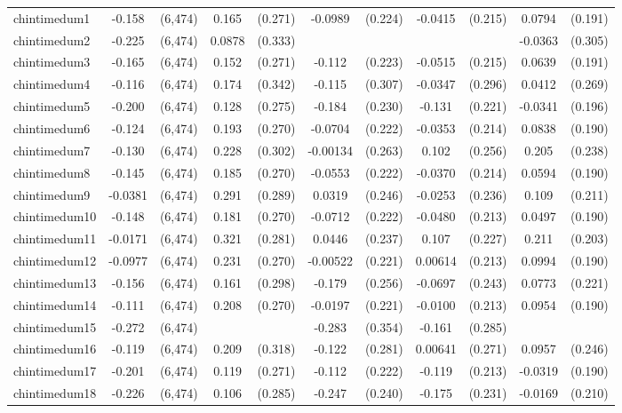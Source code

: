 \documentclass[]{article}
\begin{document}
\begin{tabular}{lcccccccccc}
chintimedum1 & -0.158 & (6,474) & 0.165 & (0.271) & -0.0989 & (0.224) & -0.0415 & (0.215) & 0.0794 & (0.191) \\
chintimedum2 & -0.225 & (6,474) & 0.0878 & (0.333) &  &  &  &  & -0.0363 & (0.305) \\
chintimedum3 & -0.165 & (6,474) & 0.152 & (0.271) & -0.112 & (0.223) & -0.0515 & (0.215) & 0.0639 & (0.191) \\
chintimedum4 & -0.116 & (6,474) & 0.174 & (0.342) & -0.115 & (0.307) & -0.0347 & (0.296) & 0.0412 & (0.269) \\
chintimedum5 & -0.200 & (6,474) & 0.128 & (0.275) & -0.184 & (0.230) & -0.131 & (0.221) & -0.0341 & (0.196) \\
chintimedum6 & -0.124 & (6,474) & 0.193 & (0.270) & -0.0704 & (0.222) & -0.0353 & (0.214) & 0.0838 & (0.190) \\
chintimedum7 & -0.130 & (6,474) & 0.228 & (0.302) & -0.00134 & (0.263) & 0.102 & (0.256) & 0.205 & (0.238) \\
chintimedum8 & -0.145 & (6,474) & 0.185 & (0.270) & -0.0553 & (0.222) & -0.0370 & (0.214) & 0.0594 & (0.190) \\
chintimedum9 & -0.0381 & (6,474) & 0.291 & (0.289) & 0.0319 & (0.246) & -0.0253 & (0.236) & 0.109 & (0.211) \\
chintimedum10 & -0.148 & (6,474) & 0.181 & (0.270) & -0.0712 & (0.222) & -0.0480 & (0.213) & 0.0497 & (0.190) \\
chintimedum11 & -0.0171 & (6,474) & 0.321 & (0.281) & 0.0446 & (0.237) & 0.107 & (0.227) & 0.211 & (0.203) \\
chintimedum12 & -0.0977 & (6,474) & 0.231 & (0.270) & -0.00522 & (0.221) & 0.00614 & (0.213) & 0.0994 & (0.190) \\
chintimedum13 & -0.156 & (6,474) & 0.161 & (0.298) & -0.179 & (0.256) & -0.0697 & (0.243) & 0.0773 & (0.221) \\
chintimedum14 & -0.111 & (6,474) & 0.208 & (0.270) & -0.0197 & (0.221) & -0.0100 & (0.213) & 0.0954 & (0.190) \\
chintimedum15 & -0.272 & (6,474) &  &  & -0.283 & (0.354) & -0.161 & (0.285) &  &  \\
chintimedum16 & -0.119 & (6,474) & 0.209 & (0.318) & -0.122 & (0.281) & 0.00641 & (0.271) & 0.0957 & (0.246) \\
chintimedum17 & -0.201 & (6,474) & 0.119 & (0.271) & -0.112 & (0.222) & -0.119 & (0.213) & -0.0319 & (0.190) \\
chintimedum18 & -0.226 & (6,474) & 0.106 & (0.285) & -0.247 & (0.240) & -0.175 & (0.231) & -0.0169 & (0.210) \\

\end{tabular}
\end{document}
